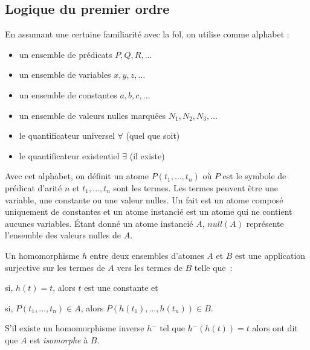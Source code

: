 \subsection{Logique du premier ordre}

En assumant une certaine familiarité avec la \gls{fol}, on utilise comme alphabet :
\begin{itemize}
    \item un ensemble de prédicats $P, Q, R, \dots$
    \item un ensemble de variables $x, y, z, \dots$
    \item un ensemble de constantes $a, b, c, \dots$
    \item un ensemble de valeurs nulles marquées $N_1, N_2, N_3, \dots$
    \item le quantificateur universel $\forall$ (quel que soit)
    \item le quantificateur existentiel $\exists$ (il existe)
\end{itemize}
Avec cet alphabet, on définit un atome $P(t_1, \dots, t_n)$ où $P$ est le symbole de prédicat d'arité $n$ et $t_1, \dots, t_n$ sont les termes.
Les termes peuvent être une variable, une constante ou une valeur nulles.
Un fait est un atome composé uniquement de constantes et un atome instancié est un atome qui ne contient aucunes variables.
Étant donné un atome instancié $A$, $null(A)$ représente l'ensemble des valeurs nulles de $A$.

Un homomorphisme $h$ entre deux ensembles d'atomes $A$ et $B$ est une application surjective sur les termes de $A$ vers les termes de $B$ telle que :
\begin{enumerate*}[label=(\roman*)]
    \item si, $h(t) = t$, alors $t$ est une constante et
    \item si, $P(t_1, \dots, t_n) \in A$, alors $P(h(t_1), \dots, h(t_n)) \in B$.
\end{enumerate*}
S'il existe un homomorphisme inverse $h^-$ tel que $h^-(h(t)) = t$ alors ont dit que $A$ est \textit{isomorphe} à $B$.

